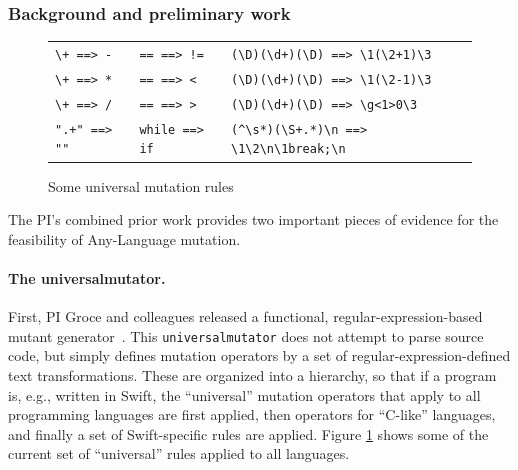 \subsubsection{Background and preliminary work}


\begin{figure}
\begin{tabularx}{0.75\textwidth}{XXX}
\verb|\+ ==> -| & \verb|== ==> !=| & \verb|(\D)(\d+)(\D) ==> \1(\2+1)\3|\\
\verb|\+ ==> *| & \verb|== ==> <| & \verb|(\D)(\d+)(\D) ==> \1(\2-1)\3|\\
\verb|\+ ==> /| & \verb|== ==> >| & \verb|(\D)(\d+)(\D) ==> \g<1>0\3|\\
\verb|".+" ==> ""| & \verb|while ==> if| & \verb|(^\s*)(\S+.*)\n ==> \1\2\n\1break;\n|\\
\end{tabularx}
\caption{Some universal mutation rules}
\label{fig:rules}
\end{figure}

The PI's combined prior work provides two important pieces of evidence for the
feasibility of Any-Language mutation.  

\paragraph{The universalmutator.} First, PI Groce and colleagues
released a functional, regular-expression-based mutant
generator~\cite{regexpMut,universalmutator}.
This {\tt universalmutator} 
does not attempt to parse source code, but simply defines mutation
operators by a set of regular-expression-defined text transformations.  These
are organized into a hierarchy, so that if a program is, e.g., written in Swift,
the ``universal'' mutation operators that apply to all programming languages are
first applied, then operators for ``C-like'' languages, and finally a set of
Swift-specific rules are applied.  Figure \ref{fig:rules} shows some of the
current set of ``universal'' rules applied to all languages.  

